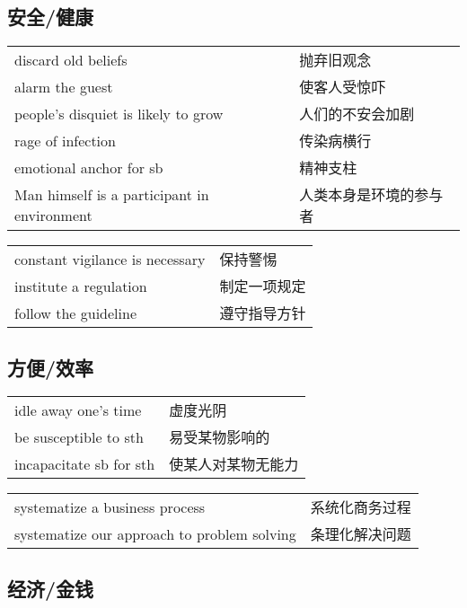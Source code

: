 \subsection{安全/健康}

\begin{tabular}{ll}
    discard old beliefs                         & 抛弃旧观念       \\
    alarm the guest                             & 使客人受惊吓      \\
    people's disquiet is likely to grow         & 人们的不安会加剧    \\
    rage of infection                           & 传染病横行       \\
    emotional anchor for sb                     & 精神支柱        \\
    Man himself is a participant in environment & 人类本身是环境的参与者 \\
\end{tabular}

\begin{tabular}{ll}
    constant vigilance is necessary & 保持警惕   \\
    institute a regulation          & 制定一项规定 \\
    follow the guideline            & 遵守指导方针 \\
\end{tabular}

\subsection{方便/效率}

\begin{tabular}{ll}
    idle away one's time    & 虚度光阴      \\
    be susceptible to sth   & 易受某物影响的   \\
    incapacitate sb for sth & 使某人对某物无能力 \\
\end{tabular}

\begin{tabular}{ll}
    systematize a business process              & 系统化商务过程 \\
    systematize our approach to problem solving & 条理化解决问题 \\
\end{tabular}

\subsection{经济/金钱}

